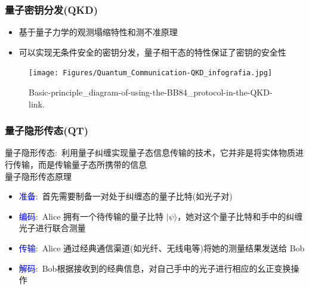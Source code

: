 \begin{frame}
	\frametitle{量子密钥分发\textrm{(QKD)}}
    \begin{itemize}
        \item 基于量子力学的观测塌缩特性和测不准原理
        \item 可以实现无条件安全的密钥分发，量子相干态的特性保证了密钥的安全性
    \end{itemize}
    \begin{figure}
        \centering
                \texttt{[image: Figures/Quantum\_Communication-QKD\_infografia.jpg]}
		\caption{\tiny{\textrm{Basic-principle_diagram-of-using-the-BB84_protocol-in-the-QKD-link.}}}
		\label{Fig:Basic-principle_diagram-of-using-the-BB84_protocol-in-the-QKD-link}
    \end{figure}
\vskip -10pt
{\fontsize{7.5pt}{5.2pt}}
\end{frame}

\begin{frame}
	\frametitle{量子隐形传态\textrm{(QT)}}
        量子隐形传态:~利用量子纠缠实现量子态信息传输的技术，它并非是将实体物质进行传输，而是传输量子态所携带的信息\\
    量子隐形传态原理
    \begin{itemize}
	    \item \textcolor{blue}{准备}:~首先需要制备一对处于纠缠态的量子比特(如光子对)\\
		    {\fontsize{7.5pt}{5.2pt}}
	    \item \textcolor{blue}{编码}:~\textrm{Alice} 拥有一个待传输的量子比特 \( |\psi\rangle \)，她对这个量子比特和手中的纠缠光子进行联合测量\\
		    {\fontsize{7.5pt}{5.2pt}}
	    \item \textcolor{blue}{传输}:~\textrm{Alice} 通过经典通信渠道(如光纤、无线电等)将她的测量结果发送给 \textrm{Bob}
	    \item \textcolor{blue}{解码}:~\textrm{Bob}根据接收到的经典信息，对自己手中的光子进行相应的幺正变换操作\\
		    {\fontsize{7.5pt}{5.2pt}\selectfont{使该光子的状态变为 \( |\psi\rangle \)，实现了量子态的传输}}
    \end{itemize}
\end{frame}

